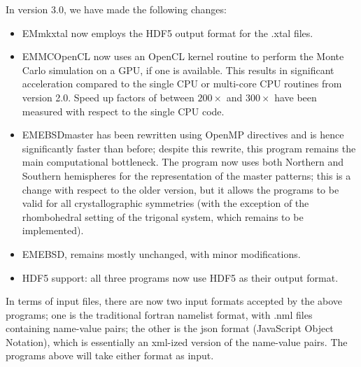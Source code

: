 \documentclass[DIV=calc, paper=letter, fontsize=11pt]{scrartcl}	 %
\begin{document}
In version 3.0, we have made the following changes:
\begin{itemize}
	\item \textsf{EMmkxtal} now employs the HDF5 output format for the .xtal files.
	\item \textsf{EMMCOpenCL} now uses an OpenCL kernel routine to perform the Monte Carlo simulation on a GPU, if one is available.  This results in significant acceleration compared to the single CPU or multi-core CPU routines from version 2.0.  Speed up factors of between $200\times$ and $300\times$ have been measured with respect to the single CPU code.
	\item \textsf{EMEBSDmaster} has been rewritten using OpenMP directives and is hence significantly faster than before; despite this rewrite, this program 
	remains the main computational bottleneck.  The program now uses both Northern and Southern hemispheres for the representation of the master patterns; this is a change with respect to the older version, but it allows the programs to be valid for all crystallographic symmetries (with the exception of the rhombohedral setting of the trigonal system, which remains to be implemented).
	\item \textsf{EMEBSD}, remains mostly unchanged, with minor modifications.
	\item HDF5 support: all three programs now use HDF5 as their output format.
\end{itemize}
In terms of input files, there are now two input formats accepted by the above programs; one is the traditional fortran namelist format, with .nml files containing name-value pairs;
the other is the json format (JavaScript Object Notation), which is essentially an xml-ized version of the name-value pairs.  The programs above will take either format as input.


\newpage
\end{document}
